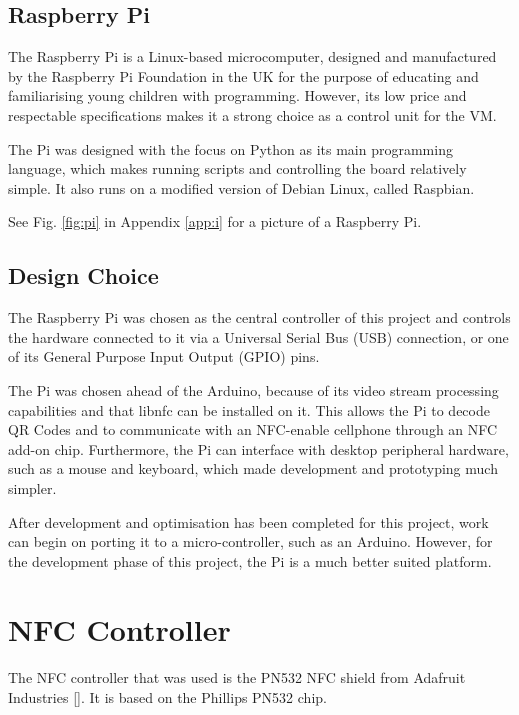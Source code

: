 \subsection{Raspberry Pi}
\label{sec:raspi}

The Raspberry Pi is a Linux-based microcomputer, designed and manufactured by the
Raspberry Pi Foundation in the UK for the purpose of educating and familiarising young
children with programming. However, its low price and respectable specifications makes it
a strong choice as a control unit for the VM.

The Pi was designed with the focus on Python as its main programming language, which makes
running scripts and controlling the board relatively simple. It also runs on a modified
version of Debian Linux, called Raspbian.

See Fig. \ref{fig:pi} in Appendix \ref{app:i} for a picture of a Raspberry Pi.

\subsection{Design Choice}

The Raspberry Pi was chosen as the central controller of this project and
controls the hardware connected to it via a Universal Serial Bus (USB) connection, or one of
its General Purpose Input Output (GPIO) pins.

The Pi was chosen ahead of the Arduino, because of its video stream processing
capabilities and that libnfc can be installed on it. This allows the Pi to decode QR
Codes and to communicate with an NFC-enable cellphone through an NFC add-on chip.
Furthermore, the Pi can interface with desktop peripheral hardware, such as a mouse and
keyboard, which made development and prototyping much simpler.

After development and optimisation has been completed for this project, work can begin on
porting it to a micro-controller, such as an Arduino. However, for the development phase
of this project, the Pi is a much better suited platform.

\section{NFC Controller}
\label{sec:nfc-controller}

The NFC controller that was used is the PN532 NFC shield from Adafruit Industries
[\cite{website:adafruit-nfc}]. It is based on the Phillips PN532 chip. 

